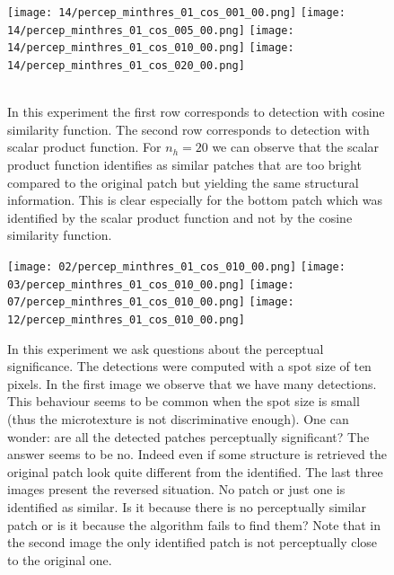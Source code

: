 \begin{figure}[H]
  \centering
  {\texttt{[image: 14/percep\_minthres\_01\_cos\_001\_00.png]}} \hfill
  {\texttt{[image: 14/percep\_minthres\_01\_cos\_005\_00.png]}} \hfill
  {\texttt{[image: 14/percep\_minthres\_01\_cos\_010\_00.png]}} \hfill  
  {\texttt{[image: 14/percep\_minthres\_01\_cos\_020\_00.png]}} \hfill \\  
     \hfill
   \hfill
   \hfill  
   \hfill \\
  \caption{In this experiment the first row corresponds to detection with cosine similarity function. The second row corresponds to detection with scalar product function. For $n_h = 20$ we can observe that the scalar product function identifies as similar patches that are too bright compared to the original patch but yielding the same structural information. This is clear especially for the bottom patch which was identified by the scalar product function and not by the cosine similarity function.}
  \label{f:robustness_detection}
\end{figure}

\begin{figure}[H]
  \centering
  {\texttt{[image: 02/percep\_minthres\_01\_cos\_010\_00.png]}} \hfill
  {\texttt{[image: 03/percep\_minthres\_01\_cos\_010\_00.png]}} \hfill
  {\texttt{[image: 07/percep\_minthres\_01\_cos\_010\_00.png]}} \hfill
  {\texttt{[image: 12/percep\_minthres\_01\_cos\_010\_00.png]}} \hfill
  \caption{In this experiment we ask questions about the perceptual significance. The detections were computed with a spot size of ten pixels. In the first image we observe that we have many detections. This behaviour seems to be common when the spot size is small (thus the microtexture is not discriminative enough). One can wonder: are all the detected patches perceptually significant? The answer seems to be no. Indeed even if some structure is retrieved the original patch look quite different from the identified. The last three images present the reversed situation. No patch or just one is identified as similar. Is it because there is no perceptually similar patch or is it because the algorithm fails to find them? Note that in the second image the only identified patch is not perceptually close to the original one. }
  \label{f:perceptual_question}
  \end{figure}

